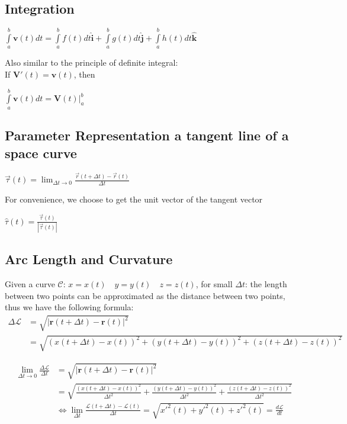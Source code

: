 \documentclass[UTF8,a4paper, 10pt, openany]{svmono}
\begin{document}
\subsection{Integration}
\begin{center}
$\displaystyle\int\limits_a^b \mathbf{v}(t)dt=\displaystyle\int\limits_a^b f(t)dt \mathbf{\hat{i}}+\displaystyle\int\limits_a^b g(t)dt \mathbf{\hat{j}}+\displaystyle\int\limits_a^b h(t)dt \mathbf{\hat{k}}$
\end{center}
Also similar to the principle of definite integral:\\
If $\mathbf{V}'(t)=\mathbf{v}(t)$, then
\begin{center}
$\displaystyle\int\limits_a^b \mathbf{v}(t)dt=\mathbf{V}(t) |_{a}^b$
\end{center}
\subsection{Parameter Representation a tangent line of a space curve}
\begin{center}
$\overrightarrow{\tau}(t)=\displaystyle\lim_{\Delta t\to 0}\frac{\overrightarrow{r}(t+\Delta t)-\overrightarrow{r}(t)}{\Delta t} $
\end{center}
For convenience, we choose to get the unit vector of the tangent vector \\
\begin{center}
$\hat{\tau }(t)=\frac{\overrightarrow{\tau }(t)}{|\overrightarrow{\tau }(t)|}$
\end{center}

\subsection{Arc Length and Curvature}
Given a curve $\mathcal{C}$: $x=x(t)\quad y=y(t)\quad z=z(t)$, for small $\Delta t$: the length between two points can be approximated as the distance between two points, thus we have the following formula:
\begin{align*}
\Delta\mathcal{L} & = \sqrt{|\mathbf{r}(t+\Delta t)-\mathbf{r}(t)|^2}\\
& =\sqrt{(x(t+\Delta t)-x(t))^2+(y(t+\Delta t)-y(t))^2+(z(t+\Delta t)-z(t))^2}
\end{align*}

\begin{align*}
\lim_{\Delta t \to 0}\frac{\Delta\mathcal{L}}{\Delta t} &= \sqrt{|\mathbf{r}(t+\Delta t)-\mathbf{r}(t)|^2}	\\
&= \sqrt{\frac{(x(t+\Delta t)-x(t))^2}{\Delta t^2}+\frac{(y(t+\Delta t)-y(t))^2}{\Delta t^2}+\frac{(z(t+\Delta t)-z(t))^2}{\Delta t^2}}		\\
&\iff \displaystyle\lim_{\Delta t}\frac{\mathcal{L}(t+\Delta t)-\mathcal{L}(t)}{\Delta t}=\sqrt{x'^2(t)+y'^2(t)+z'^2(t)}=\frac{d\mathcal{L}}{dt}
\end{align*}
\end{document}
